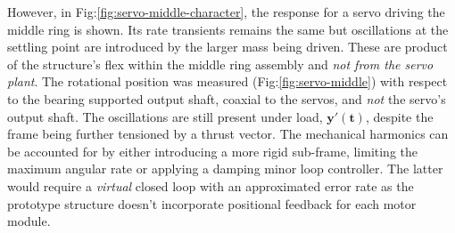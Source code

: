 \par
However, in Fig:\ref{fig:servo-middle-character}, the response for a servo driving the middle ring is shown. Its rate transients remains the same but oscillations at the settling point are introduced by the larger mass being driven. These are product of the structure's flex within the middle ring assembly and \emph{not from the servo plant}. The rotational position was measured (Fig:\ref{fig:servo-middle}) with respect to the bearing supported output shaft, coaxial to the servos, and \emph{not} the servo's output shaft. The oscillations are still present under load, {\color{Red}$\mathbf{y'(t)}$}, despite the frame being further tensioned by a thrust vector. The mechanical harmonics can be accounted for by either introducing a more rigid sub-frame, limiting the maximum angular rate or applying a damping minor loop controller. The latter would require a \emph{virtual} closed loop with an approximated error rate as the prototype structure doesn't incorporate positional feedback for each motor module.
